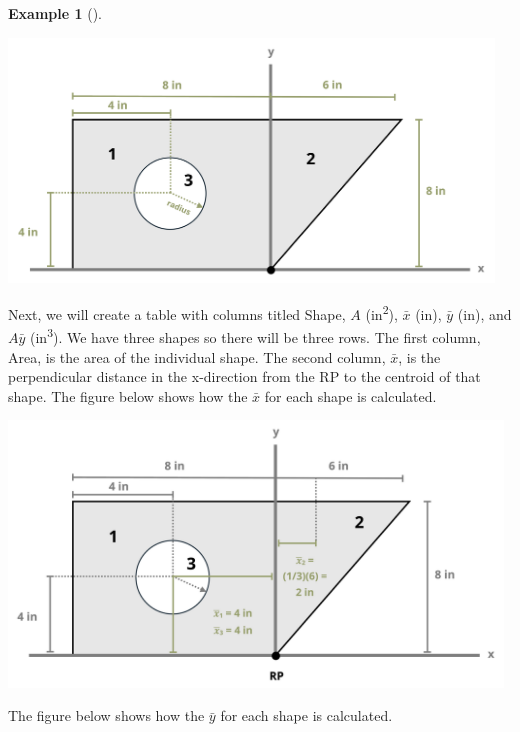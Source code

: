 \documentclass[
  letterpaper,
  DIV=11,
  numbers=noendperiod]{scrreprt}
\theoremstyle{definition}
\newtheorem{example}{Example}[chapter]
\theoremstyle{remark}
\begin{document}
\begin{tcolorbox}
\begin{example}[]
\begin{tcolorbox}
\begin{center}
\includegraphics[width=5.07292in,height=\textheight]{images/CH 8 PNGs/example 8.3 part 2.png}
\end{center}

Next, we will create a table with columns titled Shape, \(A\)
(in\textsuperscript{2}), \(\bar{x}\) (in), \(\bar{y}\) (in), and
\(A\bar{y}\) (in\textsuperscript{3}). We have three shapes so there will
be three rows. The first column, Area, is the area of the individual
shape. The second column, \(\bar{x}\), is the perpendicular distance in
the x-direction from the RP to the centroid of that shape. The figure
below shows how the \(\bar{x}\) for each shape is calculated.

\begin{center}
\includegraphics[width=5.16667in,height=\textheight]{images/CH 8 PNGs/example 8.3 part 3.png}
\end{center}

The figure below shows how the \(\bar{y}\) for each shape is calculated.


\end{tcolorbox}
\end{example}
\end{tcolorbox}
\end{document}
